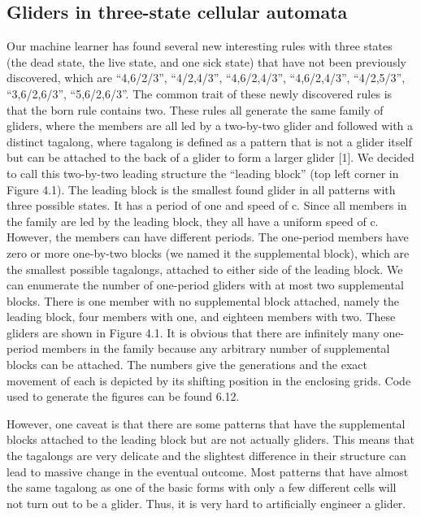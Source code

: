 \documentclass[12pt]{article}
\numberwithin{figure}{section} %
\begin{document}
\subsection{Gliders in three-state cellular automata}
Our machine learner has found several new interesting rules with three states (the dead state, the live state, and one sick state) that have not been previously discovered, which are “4,6/2/3”, “4/2,4/3”, “4,6/2,4/3”, “4,6/2,4/3”, “4/2,5/3”, “3,6/2,6/3”, “5,6/2,6/3”. The common trait of these newly discovered rules is that the born rule contains two. These rules all generate the same family of gliders, where the members are all led by a two-by-two glider and followed with a distinct tagalong, where tagalong is defined as a pattern that is not a glider itself but can be attached to the back of a glider to form a larger glider [1]. We decided to call this two-by-two leading structure the “leading block” (top left corner in Figure 4.1). The leading block is the smallest found glider in all patterns with three possible states. It has a period of one and speed of c. Since all members in the family are led by the leading block, they all have a uniform speed of c. However, the members can have different periods. The one-period members have zero or more one-by-two blocks (we named it the supplemental block), which are the smallest possible tagalongs, attached to either side of the leading block. We can enumerate the number of one-period gliders with at most two supplemental blocks. There is one member with no supplemental block attached, namely the leading block, four members with one, and eighteen members with two. These gliders are shown in Figure 4.1. It is obvious that there are infinitely many one-period members in the family because any arbitrary number of supplemental blocks can be attached. The numbers give the generations and the exact movement of each is depicted by its shifting position in the enclosing grids. Code used to generate the figures can be found 6.12. 

However, one caveat is that there are some patterns that have the supplemental blocks attached to the leading block but are not actually gliders. This means that the tagalongs are very delicate and the slightest difference in their structure can lead to massive change in the eventual outcome. Most patterns that have almost the same tagalong as one of the basic forms with only a few different cells will not turn out to be a glider. Thus, it is very hard to artificially engineer a glider.
\end{document}

